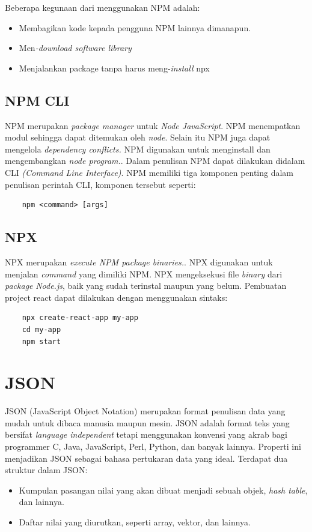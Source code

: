 Beberapa kegunaan dari menggunakan NPM adalah:
\begin{itemize}
	\item Membagikan kode kepada pengguna NPM lainnya dimanapun.
	\item Men\textit{-download software library}
	\item Menjalankan pack\textit{}age tanpa harus meng-\textit{install} npx
\end{itemize}

\subsection{NPM CLI}
NPM merupakan \textit{package manager} untuk \textit{Node JavaScript}. NPM menempatkan modul sehingga dapat ditemukan oleh \textit{node}. Selain itu NPM juga dapat mengelola \textit{dependency conflicts.} NPM digunakan untuk menginstall dan mengembangkan \textit{node program.}. Dalam penulisan NPM dapat dilakukan didalam CLI \textit{(Command Line Interface)}. NPM memiliki tiga komponen penting dalam penulisan perintah CLI, komponen tersebut seperti:
\begin{verbatim}
	npm <command> [args]
\end{verbatim}

\subsection{NPX}
NPX merupakan \textit{execute NPM package binaries.}. NPX digunakan untuk menjalan \textit{command} yang dimiliki NPM. NPX mengeksekusi file \textit{binary} dari \textit{package} \textit{Node.js}, baik yang sudah terinstal maupun yang belum. Pembuatan project react dapat dilakukan dengan menggunakan sintaks:
\begin{verbatim}
	npx create-react-app my-app
	cd my-app
	npm start
\end{verbatim}

\section{JSON}
JSON (JavaScript Object Notation) merupakan format penulisan data yang mudah untuk dibaca manusia maupun mesin. JSON adalah format teks yang bersifat \textit{language independent} tetapi menggunakan konvensi yang akrab bagi programmer C, Java, JavaScript, Perl, Python, dan banyak lainnya. Properti ini menjadikan JSON sebagai bahasa pertukaran data yang ideal. Terdapat dua struktur dalam JSON:
\begin{itemize}
	\item Kumpulan pasangan nilai yang akan dibuat menjadi sebuah objek, \textit{hash table}, dan lainnya.
	\item Daftar nilai yang diurutkan, seperti array, vektor, dan lainnya.
\end{itemize}
